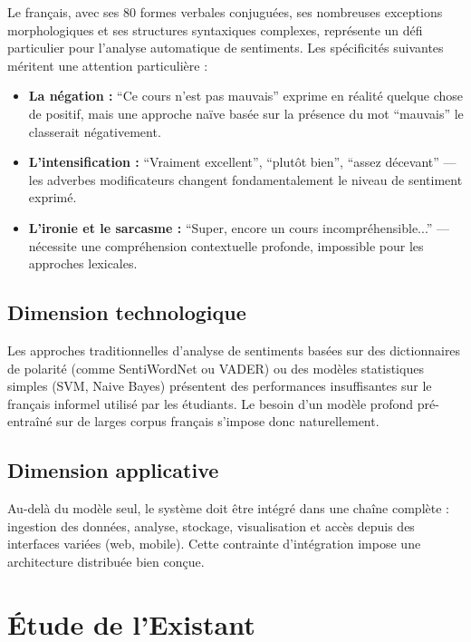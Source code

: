 Le français, avec ses 80 formes verbales conjuguées, ses nombreuses
exceptions morphologiques et ses structures syntaxiques complexes, représente
un défi particulier pour l'analyse automatique de sentiments. Les spécificités
suivantes méritent une attention particulière :

\begin{itemize}
  \item \textbf{La négation :} ``Ce cours n'est pas mauvais'' exprime en
        réalité quelque chose de positif, mais une approche naïve basée
        sur la présence du mot ``mauvais'' le classerait négativement.
  \item \textbf{L'intensification :} ``Vraiment excellent'', ``plutôt bien'',
        ``assez décevant'' — les adverbes modificateurs changent fondamentalement
        le niveau de sentiment exprimé.
  \item \textbf{L'ironie et le sarcasme :} ``Super, encore un cours
        incompréhensible...'' — nécessite une compréhension contextuelle
        profonde, impossible pour les approches lexicales.
\end{itemize}

\subsection{Dimension technologique}

Les approches traditionnelles d'analyse de sentiments basées sur des
dictionnaires de polarité (comme SentiWordNet ou VADER) ou des modèles
statistiques simples (SVM, Naive Bayes) présentent des performances
insuffisantes sur le français informel utilisé par les étudiants. Le
besoin d'un modèle profond pré-entraîné sur de larges corpus français
s'impose donc naturellement.

\subsection{Dimension applicative}

Au-delà du modèle seul, le système doit être intégré dans une chaîne
complète : ingestion des données, analyse, stockage, visualisation et
accès depuis des interfaces variées (web, mobile). Cette contrainte
d'intégration impose une architecture distribuée bien conçue.

\section{Étude de l'Existant}

